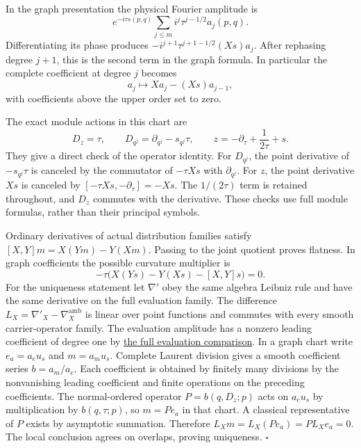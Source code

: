 \documentclass[
  english,
  11pt,
  reqno]{amsart}
\begin{document}
In the graph presentation the physical Fourier amplitude is%
 \[
e^{-i\tau s(p,q)}
\sum_{j\le m}i^j\tau^{j-1/2}a_j(p,q).
\] Differentiating its phase produces \(-i^{j+1}\tau^{j+1-1/2}(Xs)a_j\).
After rephasing degree \(j+1\), this is the second term in the graph
formula. In particular the complete coefficient at degree \(j\) becomes%
 \[
a_j\longmapsto Xa_j-(Xs)a_{j-1},
\] with coefficients above the upper order set to zero.

The exact module actions in this chart are%
 \[
D_z=\tau,\qquad
D_{q^j}=\partial_{q^j}-s_{q^j}\tau,
\qquad
z=-\partial_\tau+\frac1{2\tau}+s.
\] They give a direct check of the operator identity. For \(D_{q^j}\),
the point derivative of \(-s_{q^j}\tau\) is canceled by the commutator
of \(-\tau Xs\) with \(\partial_{q^j}\). For \(z\), the point derivative
\(Xs\) is canceled by \([-\tau Xs,-\partial_\tau]=-Xs\). The
\(1/(2\tau)\) term is retained throughout, and \(D_z\) commutes with the
derivative. These checks use full module formulas, rather than their
principal symbols.

Ordinary derivatives of actual distribution families satisfy
\([X,Y]m=X(Ym)-Y(Xm)\). Passing to the joint quotient proves flatness.
In graph coefficients the possible curvature multiplier is \[
-\tau\bigl(X(Ys)-Y(Xs)-[X,Y]s\bigr)=0.
\] For the uniqueness statement let \(\nabla'\) obey the same algebra
Leibniz rule and have the same derivative on the full evaluation family.
The difference \(L_X=\nabla'_X-\nabla_X^{\mathrm{amb}}\) is linear over
point functions and commutes with every smooth carrier-operator family.
The evaluation amplitude has a nonzero leading coefficient of degree one
by \hyperref[prop:online-wave-full-evaluation-comparison]{the full
evaluation comparison}. In a graph chart write \(e_a=a_eu_s\) and
\(m=a_mu_s\). Complete Laurent division gives a smooth coefficient
series \(b=a_m/a_e\). Each coefficient is obtained by finitely many
divisions by the nonvanishing leading coefficient and finite operations
on the preceding coefficients. The normal-ordered operator
\(P=b(q,D_z;p)\) acts on \(a_eu_s\) by multiplication by
\(b(q,\tau;p)\), so \(m=Pe_a\) in that chart. A classical representative
of \(P\) exists by asymptotic summation. Therefore
\(L_Xm=L_X(Pe_a)=P L_Xe_a=0\). The local conclusion agrees on overlaps,
proving uniqueness. \hfill\(\square\)
\end{document}
